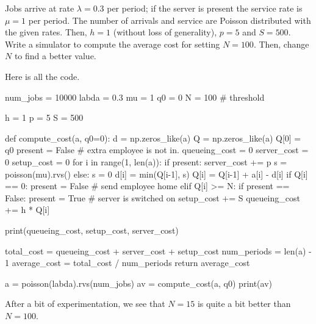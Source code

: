 \begin{exercise}
  Jobs arrive at rate $\lambda=0.3$ per period; if the server is present the service rate is $\mu=1$ per period. The number of arrivals and service are Poisson distributed with the given rates. Then, $h=1$ (without loss of generality), $p=5$ and $S=500$. Write a simulator to compute the average cost for setting $N=100$. Then, change $N$ to find a better value.

\begin{solution}
Here is all the code.  
\begin{pyverbatim}
num_jobs = 10000
labda = 0.3
mu = 1
q0 = 0
N = 100 # threshold

h = 1
p = 5
S = 500


def compute_cost(a, q0=0):
    d = np.zeros_like(a)
    Q = np.zeros_like(a)
    Q[0] = q0
    present = False  # extra employee is not in.
    queueing_cost = 0
    server_cost = 0
    setup_cost = 0
    for i in range(1, len(a)):
        if present:
            server_cost += p
            s = poisson(mu).rvs()
        else:
            s = 0
        d[i] = min(Q[i-1], s)
        Q[i] = Q[i-1] + a[i] - d[i]
        if Q[i] == 0:
            present = False  # send employee home
        elif Q[i] >= N:
            if present == False: 
	            present = True # server is switched on
                setup_cost += S            
        queueing_cost += h * Q[i]

    print(queueing_cost, setup_cost, server_cost)

    total_cost = queueing_cost + server_cost + setup_cost
    num_periods = len(a) - 1
    average_cost = total_cost / num_periods
    return average_cost

a = poisson(labda).rvs(num_jobs)
av = compute_cost(a, q0)
print(av)
\end{pyverbatim}
After a bit of experimentation, we see that $N=15$ is quite a bit better than $N=100$.

\end{solution}


\end{exercise}


